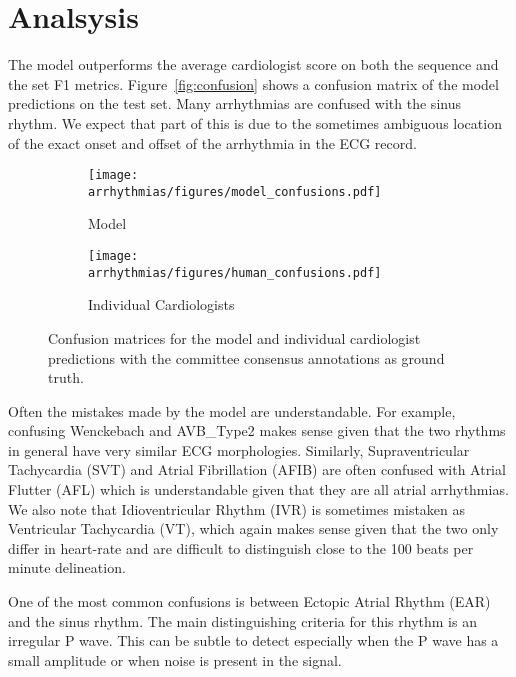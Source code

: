 \section{Analsysis}

The model outperforms the average cardiologist score on both the sequence and
the set F1 metrics. Figure~\ref{fig:confusion} shows a confusion matrix of the
model predictions on the test set. Many arrhythmias are confused with the sinus
rhythm. We expect that part of this is due to the sometimes ambiguous location
of the exact onset and offset of the arrhythmia in the ECG record.

\begin{figure}
\begin{subfigure}{.5\textwidth}
  \centering
  \texttt{[image: arrhythmias/figures/model\_confusions.pdf]}
  \caption{Model}
  \label{fig:arrhythmia:model_confusion}
\end{subfigure}
\begin{subfigure}{.5\textwidth}
  \centering
  \texttt{[image: arrhythmias/figures/human\_confusions.pdf]}
  \caption{Individual Cardiologists}
  \label{fig:arrhythmia:human_confusion}
\end{subfigure}
\caption{Confusion matrices for the model and individual cardiologist
         predictions with the committee consensus annotations as ground
         truth.}
\end{figure}

Often the mistakes made by the model are understandable. For example, confusing
Wenckebach and AVB\_Type2 makes sense given that the two rhythms in general
have very similar ECG morphologies. Similarly, Supraventricular Tachycardia
(SVT) and Atrial Fibrillation (AFIB) are often confused with Atrial Flutter
(AFL) which is understandable given that they are all atrial arrhythmias. We
also note that Idioventricular Rhythm (IVR) is sometimes mistaken as
Ventricular Tachycardia (VT), which again makes sense given that the two only
differ in heart-rate and are difficult to distinguish close to the 100 beats
per minute delineation.

One of the most common confusions is between Ectopic Atrial Rhythm (EAR) and
the sinus rhythm. The main distinguishing criteria for this rhythm is an
irregular P wave. This can be subtle to detect especially when the P wave has a
small amplitude or when noise is present in the signal.
